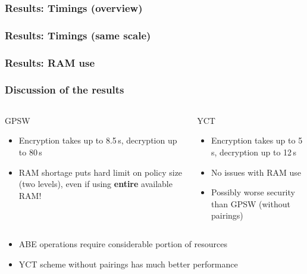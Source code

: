 \begin{frame}[c]
    \centering
    \frametitle{Results: Timings (overview)}
    \resizebox{!}{.35\textheight}{
        
    }
\end{frame}

\begin{frame}[c]
    \centering
    \frametitle{Results: Timings (same scale)}
    \resizebox{!}{.35\textheight}{
        
    }
\end{frame}

\begin{frame}[c]
    \frametitle{Results: RAM use}
    \centering
    
\end{frame}

\begin{frame}[t]
    \frametitle{Discussion of the results}
    \centering
    \vspace{1.5cm}
    \begin{columns}[t]
        \begin{block}{\centering GPSW}
            \begin{itemize}
                \item Encryption takes up to 8.5\,s, decryption up to 80\,s
                \item RAM shortage puts hard limit on policy size (two levels), even if using \textbf{entire} available RAM!
            \end{itemize}
        \end{block}
        \begin{block}{\centering YCT}
            \begin{itemize}
                \item Encryption takes up to 5\,s, decryption up to 12\,s
                \item No issues with RAM use
                \item Possibly worse security than GPSW (without pairings)
            \end{itemize}
        \end{block}
    \end{columns}
    \vspace{0.5cm}
    \begin{minipage}{.5\textwidth}
        \begin{itemize}
            \color{TUMOrange}
            [arrow]
            \item<2-> ABE operations require considerable portion of resources
            \item<3-> YCT scheme without pairings has much better performance
        \end{itemize}
    \end{minipage}
\end{frame}

